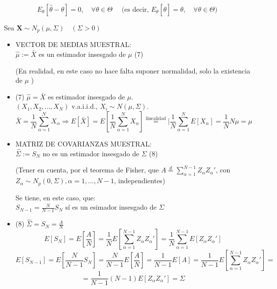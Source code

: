 \documentclass[11pt,a4paper]{article}
\begin{document}
$$E_{\theta}[\hat{\theta}-\theta]=0, \quad \forall \theta \in \Theta \quad \text { (es decir, } E_{\theta}[\hat{\theta}]=\theta, \quad \forall \theta \in \Theta)$$

Sea $\mathbf{X} \sim N_{p}(\mu, \Sigma) \quad(\Sigma>0)$

\begin{itemize}
\item VECTOR DE MEDIAS MUESTRAL: \\
$\hat{\mu}:=\bar{X}$ es un estimador insesgado de $\mu$ (7)

(En realidad, en este caso no hace falta suponer normalidad, solo la existencia de $\mu$ )

\item (7) $\hat{\mu} = \bar{X}$ es estimador insesgado de $\mu$. \\
$(X_{1}, X_{2}, \dots, X_{N})$ v.a.i.i.d., $X_{i} \sim N(\mu, \Sigma)$.
$$\bar{X} = \frac{1}{N} \sum_{\alpha=1}^{N} X_{\alpha} \Rightarrow E[\bar{X}] = E[\frac{1}{N} \sum_{\alpha=1}^{N} X_{\alpha}] \overset{\text{linealidad}}{=} |\frac{1}{N} \sum_{\alpha=1}^{N} E[X_{\alpha}] = \frac{1}{N} N\mu = \mu$$

\item MATRIZ DE COVARIANZAS MUESTRAL: \\
$\hat{\Sigma}:=S_{N}$ no es un estimador insesgado de $\Sigma$ (8)

(Tener en cuenta, por el teorema de Fisher, que $A \stackrel{d}{=} \sum_{\alpha=1}^{N-1} Z_{\alpha} Z_{\alpha}'$, con $Z_{\alpha} \sim N_{p}(0, \Sigma), \alpha=1, \ldots, N-1$, independientes)

Se tiene, en este caso, que: \\
$S_{N-1}=\frac{N}{N-1} S_{N}$ sí es un esimador insesgado de $\Sigma$

\item (8) $\hat{\Sigma} = S_{N} = \frac{A}{N}$
$$E[S_{N}] = E[\frac{A}{N}] = \frac{1}{N}E[\sum_{\alpha=1}^{N-1} Z_{\alpha}Z_{\alpha}'] = \frac{1}{N} \sum_{\alpha=1}^{N-1} E[Z_{\alpha}Z_{\alpha}']$$
$$E[S_{N-1}] = E[\frac{N}{N-1}S_{N}] = \frac{N}{N-1} E[\frac{A}{N}] = \frac{1}{N-1}E[A] = \frac{1}{N-1} E[\sum_{\alpha=1}^{N-1} Z_{\alpha}Z_{\alpha}'] =$$ $$= \frac{1}{N-1}(N-1)E[Z_{\alpha}Z_{\alpha}'] = \Sigma$$
\end{itemize}
\end{document}
